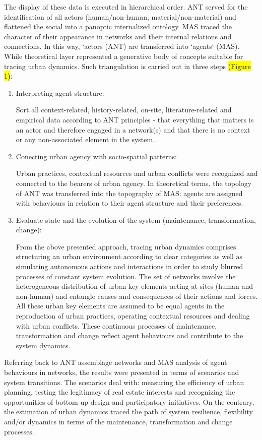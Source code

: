 \documentclass[11pt]{report}
\begin{document}
The display of these data is executed in hierarchical order. ANT served for the identification of all actors (human/non-human, material/non-material) and flattened the social into a panoptic internalized ontology. MAS traced the character of their appearance in networks and their internal relations and connections. In this way, `actors (ANT) are transferred into `agents` (MAS). While theoretical layer represented a generative body of concepts suitable for tracing urban dynamics. Such triangulation is carried out in three steps \hl{(Figure 1)}:

\begin{enumerate}
\item Interpreting agent structure:

Sort all context-related, history-related, on-site, literature-related and empirical data according to ANT principles - that everything that matters is an actor and therefore engaged in a network(s) and that there is no context or any non-associated element in the system. 

\item Conecting urban agency with socio-spatial patterns:

Urban practices, contextual resources and urban conflicts were recognized and connected to the bearers of urban agency.
In theoretical terms, the topology of ANT was transferred into the topography of MAS: agents are assigned with behaviours in relation to their agent structure and their preferences.

\item Evaluate state and the evolution of the system (maintenance, transformation, change):

From the above presented approach, tracing urban dynamics comprises structuring an urban environment according to clear categories as well as simulating autonomous actions and interactions in order to study blurred processes of constant system evolution.
The set of networks involve the heterogeneous distribution of urban key elements acting at sites (human and non-human) and entangle causes and consequences of their actions and forces.
All these urban key elements are assumed to be equal agents in the reproduction of urban practices, operating contextual resources and dealing with urban conflicts. These continuous processes of maintenance, transformation and change reflect agent behaviours and contribute to the system dynamics.
\end{enumerate}

Referring back to ANT assemblage networks and MAS analysis of agent behaviours in networks, the results were presented in terms of scenarios and system transitions. The scenarios deal with: measuring the efficiency of urban planning, testing the legitimacy of real estate interests and recognizing the opportunities of bottom-up design and participatory initiatives. On the contrary, the estimation of urban dynamics traced the path of system resilience, flexibility and/or dynamics in terms of the maintenance, transformation and change processes.
\end{document}
